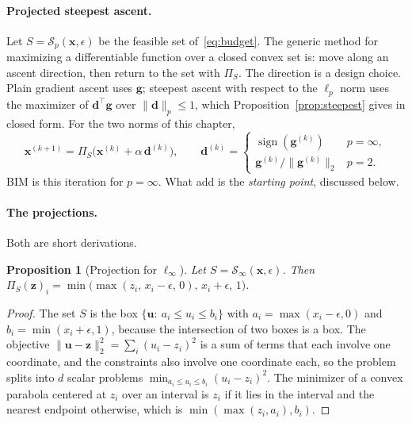 \documentclass[10pt,a4paper]{extarticle}
\newtheorem{proposition}[theorem]{Proposition}
\theoremstyle{definition}
\newcommand{\x}{\mathbf{x}}
\newcommand{\Proj}{\Pi}
\DeclareMathOperator{\sign}{sign}
\begin{document}
\paragraph{Projected steepest ascent.} Let \(S=\mathcal{S}_p(\x,\epsilon)\) be the feasible set of~\eqref{eq:budget}. The generic method for maximizing a differentiable function over a closed convex set is: move along an ascent direction, then return to the set with \(\Proj_S\). The direction is a design choice. Plain gradient ascent uses \(\mathbf{g}\); steepest ascent with respect to the \(\ell_p\) norm uses the maximizer of \(\mathbf{d}^\top\mathbf{g}\) over \(\|\mathbf{d}\|_p\le1\), which Proposition~\ref{prop:steepest} gives in closed form. For the two norms of this chapter,
\[
\x^{(k+1)}=\Proj_S\big(\x^{(k)}+\alpha\,\mathbf{d}^{(k)}\big),\qquad
\mathbf{d}^{(k)}=\begin{cases}\sign(\mathbf{g}^{(k)}) & p=\infty,\\ \mathbf{g}^{(k)}/\|\mathbf{g}^{(k)}\|_2 & p=2.\end{cases}
\]
BIM is this iteration for \(p=\infty\). What \citet{madry2018towards} add is the \emph{starting point}, discussed below.

\paragraph{The projections.} Both are short derivations.

\begin{proposition}[Projection for \(\ell_\infty\)]\label{prop:projinf}
Let \(S=\mathcal{S}_\infty(\x,\epsilon)\). Then \(\Proj_S(\mathbf{z})_i=\min\big(\max(z_i,\,x_i-\epsilon,\,0),\,x_i+\epsilon,\,1\big)\).
\end{proposition}

\begin{proof}
The set \(S\) is the box \(\{\mathbf{u}:\ a_i\le u_i\le b_i\}\) with \(a_i=\max(x_i-\epsilon,0)\) and \(b_i=\min(x_i+\epsilon,1)\), because the intersection of two boxes is a box. The objective \(\|\mathbf{u}-\mathbf{z}\|_2^2=\sum_i(u_i-z_i)^2\) is a sum of terms that each involve one coordinate, and the constraints also involve one coordinate each, so the problem splits into \(d\) scalar problems \(\min_{a_i\le u_i\le b_i}(u_i-z_i)^2\). The minimizer of a convex parabola centered at \(z_i\) over an interval is \(z_i\) if it lies in the interval and the nearest endpoint otherwise, which is \(\min(\max(z_i,a_i),b_i)\).
\end{proof}
\end{document}
